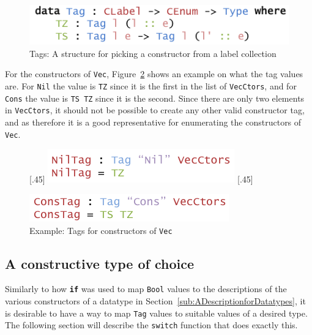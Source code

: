 \documentclass{ituthesis}
\newcommand{\ttconstructor}[1]{\textcolor{constructor-color}{\texttt{#1}}}
\newcommand{\tttype}[1]{\textcolor{type-color}{\texttt{#1}}}
\newcommand{\ttdec}[1]{\textcolor{declared-var-color}{\texttt{#1}}}
\theoremstyle{break}
\begin{document}
\begin{figure}[ht]
\begin{center}
    \includegraphics[scale=0.5]{Figures/AnInformativeEncodingofConstructorsTags.png}
\end{center}
\caption{Tags: A structure for picking a constructor from a label collection}
\label{fig:ctortags}
\end{figure}

For the constructors of \tttype{Vec}, Figure~\ref{fig:vecctor} shows an example on what the tag values are. For \ttconstructor{Nil} the value is \ttconstructor{TZ} since it is the first in the list of \ttdec{VecCtors}, and for \ttconstructor{Cons} the value
is \ttconstructor{TS~TZ} since it is the second. Since there are only two elements in \ttdec{VecCtors}, it should not be possible to create any other valid constructor tag, and as therefore it is a good representative for enumerating the constructors of \tttype{Vec}.

\begin{figure}[ht]
\begin{center}
  \subcaptionbox{Tag for \ttconstructor{Nil}\label{fig:vecctornil}}[.45\textwidth]{
    \includegraphics[scale=0.5]{Figures/VectorNilTag.png}
}
\subcaptionbox{Tag for \ttconstructor{Cons}\label{fig:vecctorcons}}[.45\textwidth]{
    \includegraphics[scale=0.5]{Figures/VectorConsTag.png}

}
\caption{Example: Tags for constructors of \tttype{Vec}}
\label{fig:vecctor}
\end{center}
\end{figure}


\subsection{A constructive type of choice}
\label{sub:AConstructiveTypeofChoice}
Similarly to how \texttt{\textbf{if}} was used to map \tttype{Bool} values to the descriptions of the various constructors of a datatype in Section~\ref{sub:ADescriptionforDatatypes}, it is desirable to have a way
to map \tttype{Tag} values to suitable values of a desired type.  The following section will describe the \ttdec{switch} function that does exactly this.
\end{document}
